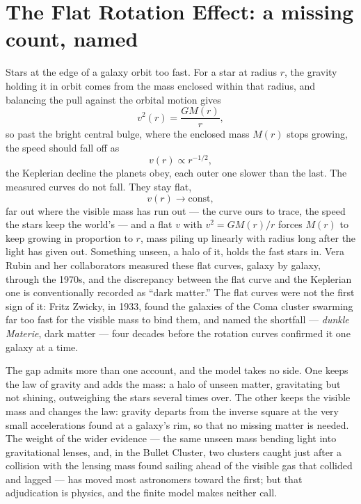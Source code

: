 \section{The Flat Rotation Effect: a missing count, named}
\label{se:flat-rotation}

Stars at the edge of a galaxy orbit too fast. For a star at radius $r$, the gravity holding it in orbit comes
from the mass enclosed within that radius, and balancing the pull against the orbital motion gives
\begin{equation}
  v^2(r) = \frac{G M(r)}{r},
\end{equation}
so past the bright central bulge, where the enclosed mass $M(r)$ stops growing, the speed should
fall off as
\begin{equation}
  v(r) \propto r^{-1/2},
\end{equation}
the Keplerian decline the planets obey, each outer one slower than the last. The measured curves do not fall.
They stay flat,
\begin{equation}
  v(r) \to \text{const},
\end{equation}
far out where the visible mass has run out --- the curve ours to trace, the speed the stars keep the world's
--- and a flat $v$ with $v^2 = GM(r)/r$ forces $M(r)$ to keep
growing in proportion to $r$, mass piling up linearly with radius long after the light has given out. Something
unseen, a halo of it, holds the fast stars in. Vera Rubin and her collaborators measured these flat curves,
galaxy by galaxy, through the 1970s, and the discrepancy between the flat curve and the Keplerian one is
conventionally recorded as ``dark matter.'' The flat curves were not the first sign of it: Fritz Zwicky, in
1933, found the galaxies of the Coma cluster swarming far too fast for the visible mass to bind them, and named
the shortfall --- \emph{dunkle Materie}, dark matter --- four decades before the rotation curves confirmed it
one galaxy at a time.

The gap admits more than one account, and the model takes no side. One keeps the law of gravity and adds
the mass: a halo of unseen matter, gravitating but not shining, outweighing the stars several times over. The
other keeps the visible mass and changes the law: gravity departs from the inverse square at the very small
accelerations found at a galaxy's rim, so that no missing matter is needed. The weight of the wider evidence ---
the same unseen mass bending light into gravitational lenses, and, in the Bullet Cluster, two clusters caught
just after a collision with the lensing mass found sailing ahead of the visible gas that collided and lagged
--- has moved most astronomers toward the first; but that adjudication is physics, and the finite model
makes neither call.

